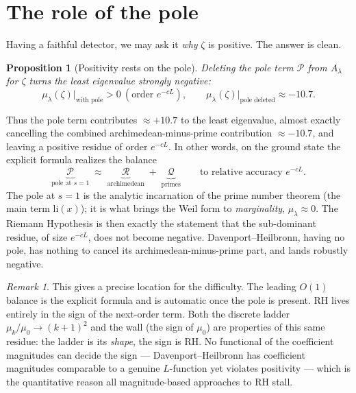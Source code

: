 \documentclass[11pt]{amsart}
\newtheorem{proposition}[theorem]{Proposition}
\theoremstyle{definition}
\theoremstyle{remark}
\newtheorem{remark}[theorem]{Remark}
\newcommand{\lam}{\lambda}
\begin{document}
\section{The role of the pole}\label{sec:pole}

Having a faithful detector, we may ask it \emph{why} $\zeta$ is positive. The answer is clean.

\begin{proposition}[Positivity rests on the pole]\label{prop:pole}
Deleting the pole term $\mathcal P$ from $A_\lam$ for $\zeta$ turns the least eigenvalue strongly negative:
\[
\mu_\lam(\zeta)\big|_{\text{with pole}}>0\ (\text{order }e^{-cL}),\qquad
\mu_\lam(\zeta)\big|_{\text{pole deleted}}\approx -10.7 .
\]
\end{proposition}

Thus the pole term contributes $\approx+10.7$ to the least eigenvalue, almost exactly cancelling the combined archimedean-minus-prime contribution $\approx-10.7$, and leaving a positive residue of order $e^{-cL}$. In other words, on the ground state the explicit formula realizes the balance
\[
\underbrace{\mathcal P}_{\text{pole at }s=1}\;\approx\;\underbrace{\mathcal R}_{\text{archimedean}}\;+\;\underbrace{\mathcal Q}_{\text{primes}}
\qquad\text{to relative accuracy } e^{-cL}.
\]
The pole at $s=1$ is the analytic incarnation of the prime number theorem (the main term $\mathrm{li}(x)$); it is what brings the Weil form to \emph{marginality}, $\mu_\lam\approx 0$. The Riemann Hypothesis is then exactly the statement that the sub-dominant residue, of size $e^{-cL}$, does not become negative. Davenport--Heilbronn, having no pole, has nothing to cancel its archimedean-minus-prime part, and lands robustly negative.

\begin{remark}
This gives a precise location for the difficulty. The leading $O(1)$ balance is the explicit formula and is automatic once the pole is present. RH lives entirely in the sign of the next-order term. Both the discrete ladder $\mu_k/\mu_0\to(k+1)^2$ and the wall (the sign of $\mu_0$) are properties of this same residue: the ladder is its \emph{shape}, the sign is RH. No functional of the coefficient magnitudes can decide the sign --- Davenport--Heilbronn has coefficient magnitudes comparable to a genuine $L$-function yet violates positivity --- which is the quantitative reason all magnitude-based approaches to RH stall.
\end{remark}
\end{document}
